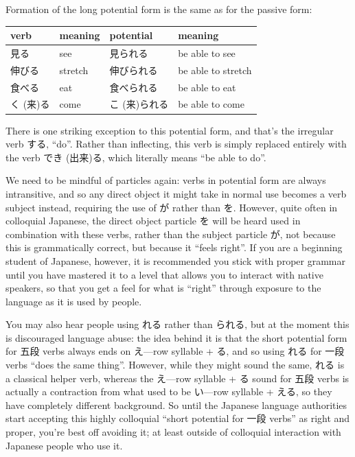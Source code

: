 \documentclass[11pt, b5paper, twoside, openright, onecolumn]{book}
\makeatletter
\newcommand*{\rtrubystack}[2]{{\relscale{0.5}%
  \begin{tabular}[b]{@{}c@{}}%
    {#1}\\%
    {\textscale{2}{#2}}%
  \end{tabular}}%
}
\DeclareRobustCommand*{\rtruby}[2]{%
  \mbox{%
    \setlength{\parskip}{0ex}%
    \BeginAccSupp{method=pdfstringdef,ActualText={#1}}%
      \rtrubystack{\phantom{#2}}{#1}%
      \llap{%
        \rtrubystack{#2}{\phantom{#1}}%
      }%
    \EndAccSupp{}%
  }%
}
\newcommand*{\rubystack}[2]{{\relscale{0.5}%
  \begin{tabular}[b]{@{}c@{}}%
    {#1}\\%
   {\textscale{2}{#2}}%
  \end{tabular}}%
}
\DeclareRobustCommand*{\ruby}[2]{%
  \mbox{%
    \setlength{\parskip}{0ex}%
    \BeginAccSupp{method=pdfstringdef,ActualText={#1}}%
      \rubystack{\phantom{#2}}{#1}%
      \llap{%
        \rubystack{#2}{\phantom{#1}}%
      }%
    \EndAccSupp{}%
  }%
}
\renewcommand*{\rtruby}[2]{#2 (#1)}%
\renewcommand*{\ruby}[2]{#2 (#1)}%
\newenvironment{mytabular}[1]{\noindent\hspace{0.4in}
\begin{tabular}[h]{#1}}{\end{tabular}}
\makeatother
\begin{document}
Formation of the long potential form is the same as for the passive form:

\vspace{0.5cm}
\smaller
\begin{mytabular}{| l  l  l  l |}\hline 
\rule{0pt}{2.4ex}verb & meaning & potential & meaning\\ 
\hline
\rule{0pt}{2.4ex}見る & see & 見られる & be able to see\\ 
\rule{0pt}{2.4ex}伸びる & stretch & 伸びられる & be able to stretch\\ 
\rule{0pt}{2.4ex}食べる & eat & 食べられる & be able to eat\\ 
\rule{0pt}{3.6ex}\rtruby{来}{く}る & come & \rtruby{来}{こ}られる & be able to come\\ 
\hline 
\end{mytabular}
\larger
\vspace{0.5cm}


There is one striking exception to this potential form‚ and that’s the irregular verb する‚ “do”. Rather than inflecting‚ this verb is simply replaced entirely with the verb \ruby{出来}{でき}る‚ which literally means “be able to do”.

We need to be mindful of particles again: verbs in potential form are always intransitive‚ and so any direct object it might take in normal use becomes a verb subject instead‚ requiring the use of が rather than を. However‚ quite often in colloquial Japanese‚ the direct object particle を will be heard used in combination with these verbs‚ rather than the subject particle が‚ not because this is grammatically correct‚ but because it “feels right”. If you are a beginning student of Japanese‚ however‚ it is recommended you stick with proper grammar until you have mastered it to a level that allows you to interact with native speakers‚ so that you get a feel for what is “right” through exposure to the language as it is used by people.

You may also hear people using れる rather than られる‚ but at the moment this is discouraged language abuse: the idea behind it is that the short potential form for 五段 verbs always ends on え—row syllable + る‚ and so using れる for 一段 verbs “does the same thing”. However‚ while they might sound the same‚ れる is a classical helper verb‚ whereas the え—row syllable + る sound for 五段 verbs is actually a contraction from what used to be い—row syllable + える‚ so they have completely different background. So until the Japanese language authorities start accepting this highly colloquial “short potential for 一段 verbs” as right and proper‚ you’re best off avoiding it; at least outside of colloquial interaction with Japanese people who use it.
\end{document}
